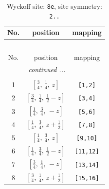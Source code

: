 \documentclass[fleqn,8pt]{jsarticle}
\begin{document}
\renewcommand{\arraystretch}{1.2}
\begin{longtable}{ccc}
\caption{Wyckoff site: {\tt 8e}, site symmetry: {\tt 2..}}
 \\
 \hline \hline
No. & position & mapping \\ \hline \endfirsthead

\multicolumn{2}{l}{\tablename\ \thetable{}} \\
 \hline \hline
No. & position & mapping \\ \hline \endhead

 \hline \hline
\multicolumn{2}{r}{\footnotesize\it continued ...} \\ \endfoot

 \hline \hline
\multicolumn{2}{r}{} \\ \endlastfoot

1 & $\left[ \frac{3}{4},\, \frac{1}{4},\, z \right]$ & {\tt [1,2]} \\ \hline
2 & $\left[ \frac{3}{4},\, \frac{1}{4},\, \frac{1}{2} - z \right]$ & {\tt [3,4]} \\ \hline
3 & $\left[ \frac{1}{4},\, \frac{3}{4},\, - z \right]$ & {\tt [5,6]} \\ \hline
4 & $\left[ \frac{1}{4},\, \frac{3}{4},\, z + \frac{1}{2} \right]$ & {\tt [7,8]} \\ \hline
5 & $\left[ \frac{1}{4},\, \frac{3}{4},\, z \right]$ & {\tt [9,10]} \\ \hline
6 & $\left[ \frac{1}{4},\, \frac{3}{4},\, \frac{1}{2} - z \right]$ & {\tt [11,12]} \\ \hline
7 & $\left[ \frac{3}{4},\, \frac{1}{4},\, - z \right]$ & {\tt [13,14]} \\ \hline
8 & $\left[ \frac{3}{4},\, \frac{1}{4},\, z + \frac{1}{2} \right]$ & {\tt [15,16]} \\
\end{longtable}
\renewcommand{\arraystretch}{1.2}
\end{document}
